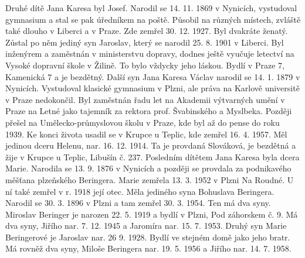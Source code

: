 \documentclass[../dejiny-rodu-prusiku.tex]{subfiles}
\begin{document}
Druhé dítě Jana Karesa byl Josef. Narodil se 14. 11. 1869 v Nynicích, vystudoval gymnasium a stal se pak úředníkem na poště. Působil na různých místech, zvláště také dlouho v Liberci a v Praze. Zde zemřel 30. 12. 1927. Byl dvakráte ženatý. Zůstal po něm jediný syn Jaroslav, který se narodil 25. 8. 1901 v Liberci. Byl inženýrem a zaměstnán v ministerstvu dopravy, dodnes ještě vyučuje letectví na Vysoké dopravní škole v Žilině. To bylo vždycky jeho láskou. Bydlí v Praze 7, Kamenická 7 a je bezdětný. Další syn Jana Karesa Václav narodil se 14. 1. 1879 v Nynicích. Vystudoval klasické gymnasium v Plzni, ale práva na Karlově universitě v Praze nedokončil. Byl zaměstnán řadu let na Akademii výtvarných umění v Praze na Letné jako tajemník za rektora prof. Švabinského a Myslbeka. Později přešel na Umělecko-průmyslovou školu v Praze, kde byl až do pense do roku 1939.  Ke konci života usadil se v Krupce u Teplic, kde zemřel 16. 4. 1957. Měl jedinou dceru Helenu, nar. 16. 12. 1914. Ta je provdaná Slováková, je bezdětná a žije v Krupce u Teplic, Libušín č. 237. Posledním dítětem Jana Karesa byla dcera Marie. Narodila se 13. 9. 1876 v Nynicích a později se provdala za podnikavého měšťana plzeňského Beringera. Marie zemřela 13. 3. 1952 v Plzni Na Roudné. U ní také zemřel v r. 1918 její otec. Měla jediného syna Bohuslava Beringera. Narodil se 30. 3. 1896 v Plzni a tam zemřel 30. 3. 1954. Ten má dva syny. Miroslav Beringer je narozen 22. 5. 1919 a bydlí v Plzni, Pod záhorskem č. 9. Má dva syny, Jiřího nar. 7. 12. 1945 a Jaromíra nar. 15. 7. 1953. Druhý syn Marie Beringerové je Jaroslav nar. 26  9. 1928. Bydlí ve stejném domě jako jeho bratr. Má rovněž dva syny, Miloše Beringera nar. 19. 5. 1956 a Jiřího nar. 14. 7. 1958.
\end{document}
